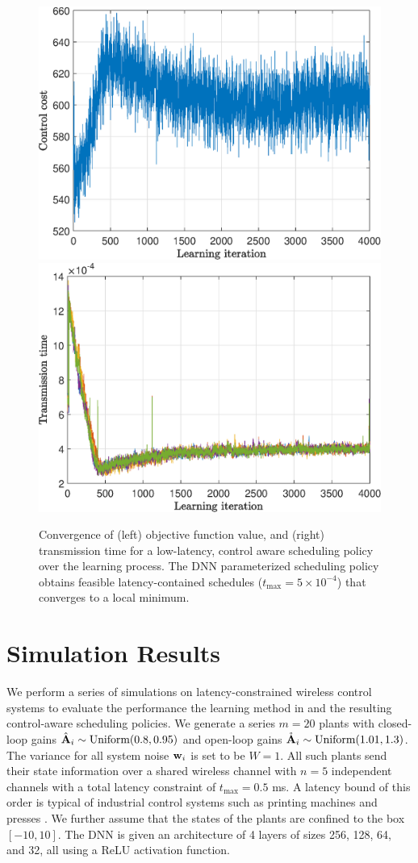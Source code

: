 \documentclass[conference,10pt]{IEEEtran}
\begin{document}
 \begin{figure}[t]
\centering
\includegraphics[width=0.45\linewidth, height=.18\textheight, keepaspectratio]{../images/cost_plot.eps} \qquad
\includegraphics[width=0.45\linewidth, height=.18\textheight, keepaspectratio]{../images/time_plot.eps} 
\caption{Convergence of (left) objective function value, and (right) transmission time for a low-latency, control aware scheduling policy over the learning process. The DNN parameterized scheduling policy obtains feasible latency-contained schedules ($t_{\max} = 5 \times 10^{-4}$) that converges to a local minimum.}\label{fig_simple_results}
\end{figure}

 
 \section{Simulation Results}\label{sec_numerical_results}
 

 
We perform a series of simulations on latency-constrained wireless control systems to evaluate the performance the learning method in and the resulting control-aware scheduling policies. We generate a series $m=20$ plants with closed-loop gains ${\hat{\mathbf A} }_i \sim \text{Uniform}(0.8,0.95)$ and open-loop gains $\mathring{{\mathbf A}}_i \sim \text{Uniform}(1.01,1.3)$. The variance for all system noise ${\mathbf w}_i$ is set to be $W=1$. All such plants send their state information over a shared wireless channel with $n=5$ independent channels with a total latency constraint of $t_{\max} = 0.5$ ms. A latency bound of this order is typical of industrial control systems such as printing machines and presses \cite{ashraf2016ultra}. We further assume that the states of the plants are confined to the box $[-10,10]$. The DNN is given an architecture of 4 layers of sizes 256, 128, 64, and 32, all using a ReLU activation function.
\end{document}
